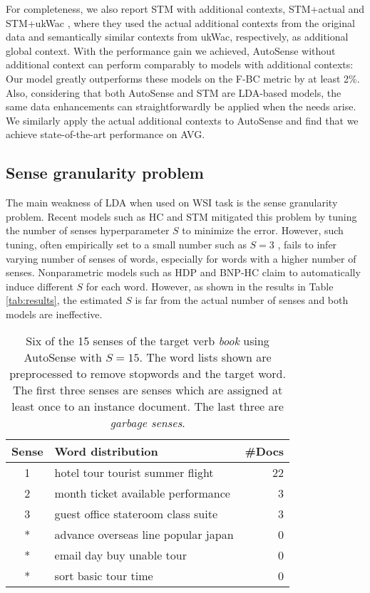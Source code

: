 \documentclass[letterpaper]{article} \usepackage{aaai19}
\begin{document}
For completeness, we also report STM with additional contexts, STM+actual and STM+ukWac \cite{wang2015sense}, where they used the actual additional contexts from the original data and semantically similar contexts from ukWac, respectively, as additional global context. With the performance gain we achieved, AutoSense without additional context can perform comparably to models with additional contexts: Our model greatly outperforms these models on the F-BC metric by at least 2\%. Also, considering that both AutoSense and STM are LDA-based models, the same data enhancements can straightforwardly be applied when the needs arise. We similarly apply the actual additional contexts to AutoSense and find that we achieve state-of-the-art performance on \textsc{AVG}.

\subsection{Sense granularity problem} \label{sec:sensegran}

The main weakness of LDA when used on WSI task is the sense granularity problem. Recent models such as HC \cite{chang2014inducing} and STM \cite{wang2015sense} mitigated this problem by tuning the number of senses hyperparameter $S$ to minimize the error. However, such tuning, often empirically set to a small number such as $S=3$ \cite{wang2015sense}, fails to infer varying number of senses of words, especially for words with a higher number of senses. Nonparametric models such as HDP and BNP-HC \cite{lau2013unimelb,chang2014inducing} claim to automatically induce different $S$ for each word. However, as shown in the results in Table \ref{tab:results}, the estimated $S$ is far from the actual number of senses and both models are ineffective.

\begin{table}[!t]
	\centering
	\begin{tabular}{|c|l|r|}
		\hline
		Sense & Word distribution & \#Docs \\ \hline
		1 & hotel tour tourist summer flight & 22 \\ \hline
		2 & month ticket available performance & 3 \\ \hline
		3 & guest office stateroom class suite & 3 \\ \hline
		* & advance overseas line popular japan & 0 \\ \hline
		* & email day buy unable tour & 0 \\ \hline
		* & sort basic tour time & 0 \\ \hline
	\end{tabular}
	\caption{Six of the 15 senses of the target verb \textit{book} using AutoSense with $S=15$.
		The word lists shown are preprocessed to remove stopwords and the target word.
		The first three senses are senses which are assigned at least once to an instance document. The last three are \textit{garbage senses}.}
	\label{tab:sample}
\end{table}
\label{sec:senses}
\end{document}
